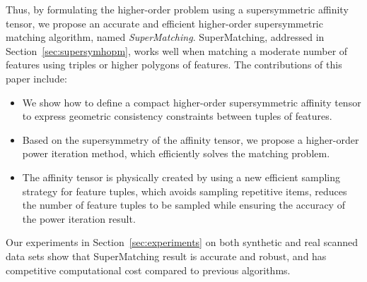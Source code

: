 Thus, by formulating the higher-order problem using a supersymmetric affinity tensor,
we propose an accurate and efficient higher-order supersymmetric matching algorithm, named \emph{SuperMatching}.
SuperMatching, addressed in Section~\ref{sec:supersymhopm}, works well when matching a moderate number of features using triples or higher polygons of features.
The contributions of this paper include:
\begin{itemize}
\item We show how to define a compact higher-order supersymmetric affinity tensor to express geometric consistency constraints between tuples of features.

\item Based on the supersymmetry of the affinity tensor, we propose a higher-order power iteration method, which efficiently solves the matching problem.

\item The affinity tensor is physically created by using a new efficient sampling strategy for feature tuples,
which avoids sampling repetitive items, reduces the number of feature tuples to be sampled while ensuring the accuracy of the power iteration result.

\end{itemize}

Our experiments in Section~\ref{sec:experiments} on both synthetic and real scanned data sets show that SuperMatching result is accurate and robust,
and has competitive computational cost compared to previous algorithms.

